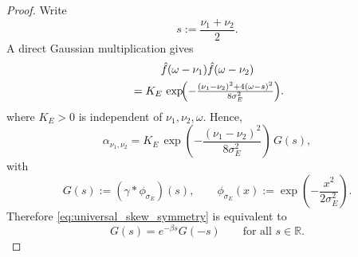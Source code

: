 \documentclass[showpacs,amsmath,amssymb,twocolumn,prx,superscriptaddress,10pt,aps,nofootinbib]{revtex4-2}
\begin{document}
\begin{proof}
Write
\begin{equation}
s:=\frac{\nu_1+\nu_2}{2}.
\end{equation}
A direct Gaussian multiplication gives
\begin{multline}
\hat f(\omega-\nu_1)\hat f(\omega-\nu_2) \\
{}= K_E\,
\exp\!\Bigl(
-\tfrac{(\nu_1-\nu_2)^2 + 4(\omega-s)^2}{8\sigma_E^2}
\Bigr).
\end{multline}
where $K_E>0$ is independent of $\nu_1,\nu_2,\omega$. Hence,
\begin{equation}
\alpha_{\nu_1,\nu_2}
=
K_E\,
\exp\!\left(-\frac{(\nu_1-\nu_2)^2}{8\sigma_E^2}\right)\,
G(s),
\end{equation}
with
\begin{equation}
G(s):=(\gamma * \phi_{\sigma_E})(s),
\qquad
\phi_{\sigma_E}(x):=\exp\!\left(-\frac{x^2}{2\sigma_E^2}\right).
\end{equation}
Therefore \eqref{eq:universal_skew_symmetry} is equivalent to
\begin{equation}
G(s)=e^{-\beta s}G(-s)
\qquad
\text{for all }s\in\mathbb R.
\end{equation}


\end{proof}
\end{document}
